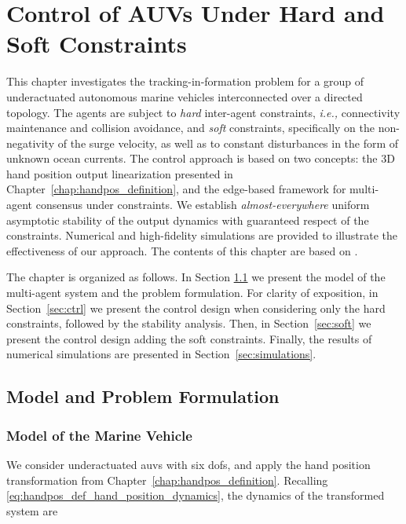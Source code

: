 \chapter{Control of AUVs Under Hard and Soft Constraints}
\label{chap:handpos_tracking}

This chapter investigates the tracking-in-formation problem for a group of underactuated autonomous marine vehicles interconnected over a directed topology.
The agents are subject to \emph{hard} inter-agent constraints, \emph{i.e.,} connectivity maintenance and collision avoidance, and \emph{soft} constraints, specifically on the non-negativity of the surge velocity, as well as to constant disturbances in the form of unknown ocean currents.
The control approach is based on two concepts: the 3D hand position output linearization presented in Chapter~\ref{chap:handpos_definition}, and the edge-based framework for multi-agent consensus under constraints.
We establish \emph{almost-everywhere} uniform asymptotic stability of the output dynamics with guaranteed respect of the constraints.
Numerical and high-fidelity simulations are provided to illustrate the effectiveness of our approach.
The contents of this chapter are based on \cite{restrepo_formation_2022,restrepo_tracking_2023}.

The chapter is organized as follows.
In Section \ref{sec:preliminaries} we present the model of the multi-agent system and the problem formulation. For clarity of exposition, in Section~\ref{sec:ctrl} we present the control design when considering only the hard constraints, followed by the stability analysis. Then, in Section~\ref{sec:soft} we present the control design adding the soft constraints. Finally, the results of numerical simulations are presented in Section~\ref{sec:simulations}.

\vspace*{-1em}

\section{Model and Problem Formulation}\label{sec:preliminaries}

\vspace*{-0.5em}

\subsection{Model of the Marine Vehicle}

We consider underactuated \glspl{auv} with six \glspl{dof}, and apply the hand position transformation from Chapter~\ref{chap:handpos_definition}.
Recalling \eqref{eq:handpos_def_hand_position_dynamics}, the dynamics of the transformed system are


